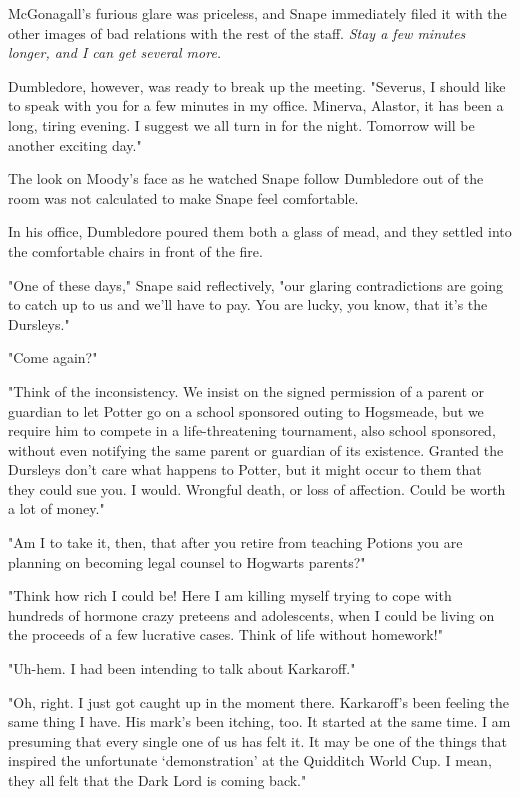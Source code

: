 McGonagall's furious glare was priceless, and Snape immediately filed it with the other images of bad relations with the rest of the staff. \emph{Stay a few minutes longer, and I can get several more.}

Dumbledore, however, was ready to break up the meeting. "Severus, I should like to speak with you for a few minutes in my office. Minerva, Alastor, it has been a long, tiring evening. I suggest we all turn in for the night. Tomorrow will be another exciting day."

The look on Moody's face as he watched Snape follow Dumbledore out of the room was not calculated to make Snape feel comfortable.

In his office, Dumbledore poured them both a glass of mead, and they settled into the comfortable chairs in front of the fire.

"One of these days," Snape said reflectively, "our glaring contradictions are going to catch up to us and we'll have to pay. You are lucky, you know, that it's the Dursleys."

"Come again?"

"Think of the inconsistency. We insist on the signed permission of a parent or guardian to let Potter go on a school sponsored outing to Hogsmeade, but we require him to compete in a life-threatening tournament, also school sponsored, without even notifying the same parent or guardian of its existence. Granted the Dursleys don't care what happens to Potter, but it might occur to them that they could sue you. I would. Wrongful death, or loss of affection. Could be worth a lot of money."

"Am I to take it, then, that after you retire from teaching Potions you are planning on becoming legal counsel to Hogwarts parents?"

"Think how rich I could be! Here I am killing myself trying to cope with hundreds of hormone crazy preteens and adolescents, when I could be living on the proceeds of a few lucrative cases. Think of life without homework!"

"Uh-hem. I had been intending to talk about Karkaroff."

"Oh, right. I just got caught up in the moment there. Karkaroff's been feeling the same thing I have. His mark's been itching, too. It started at the same time. I am presuming that every single one of us has felt it. It may be one of the things that inspired the unfortunate `demonstration' at the Quidditch World Cup. I mean, they all felt that the Dark Lord is coming back."

